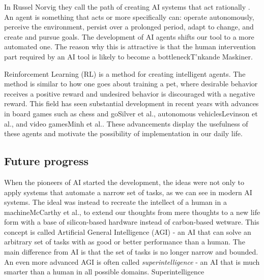 \documentclass[12pt,A4]{report}
\newcommand{\autobaj}{}
\theoremstyle{definition}
\begin{document}
In \autobaj{Russel Norvig} they call the path of creating AI systems that act rationally . An agent is something that acts or more specifically can: operate autonomously, perceive the environment, persist over a prolonged period, adapt to change, and create and pursue goals. The development of AI agents shifts our tool to a more automated one. The reason why this is attractive is that the human intervention part required by an AI tool is likely to become a bottleneck\autobaj{T'nkande Maskiner}. 

Reinforcement Learning (RL) is a method for creating intelligent agents. The method is similar to how one goes about training a pet, where desirable behavior receives a positive reward and undesired behavior is discouraged with a negative reward. This field has seen substantial development in recent years with advances in board games such as chess and go\autobaj{Silver et al.}, autonomous vehicles\autobaj{Levinson et al.}, and video games\autobaj{Minh et al.}. These advancements display the usefulness of these agents and motivate the possibility of implementation in our daily life.


\subsection{Future progress}
When the pioneers of AI started the development, the ideas were not only to apply systems that automate a narrow set of tasks, as we can see in modern AI systems. The ideal was instead to recreate the intellect of a human in a machine\autobaj{McCarthy et al.}, to extend our thoughts from mere thoughts to a new life form with a base of silicon-based hardware instead of carbon-based wetware. This concept is called Artificial General Intelligence (AGI) - an AI that can solve an arbitrary set of tasks with as good or better performance than a human. The main difference from AI is that the set of tasks is no longer narrow and bounded. An even more advanced AGI is often called \textit{superintelligence} - an AI that is much smarter than a human in all possible domains. \autobaj{Superintelligence} 
\end{document}
